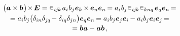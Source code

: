 \nopagebreak\vspace{-0.5em}
\begin{multline}\label{vectorcrossvectorcrossidentity}
\bigl( \bm{a} \times \bm{b} \hspace{.15ex}\bigr) \hspace{-0.33ex} \times \hspace{-0.22ex} \UnitDyad
= \permutationsparitysymbols{i\hspace{-0.1ex}j\hspace{-0.1ex}k} \hspace{.2ex} a_i \hspace{.1ex} b_j \hspace{.1ex} \bm{e}_k \hspace{-0.15ex} \times \hspace{-0.1ex} \bm{e}_n \bm{e}_n \hspace{-0.2ex}
= a_i \hspace{.1ex} b_j \hspace{.1ex} \permutationsparitysymbols{i\hspace{-0.1ex}j\hspace{-0.1ex}k} \permutationsparitysymbols{knq} \hspace{.2ex} \bm{e}_q \bm{e}_n \hspace{-0.2ex} =
\\[-0.1em]
%
= a_i b_j \bigl( \delta_{in} \delta_{j\hspace{-0.1ex}q} \hspace{-0.22ex} - \delta_{iq} \delta_{jn} \bigr) \bm{e}_q \bm{e}_n \hspace{-0.2ex}
= a_i b_j \bm{e}_j \bm{e}_i \hspace{-0.12ex} - a_i b_j \bm{e}_i \bm{e}_j \hspace{-0.2ex} =
\\[-0.1em]
%
= \bm{b} \bm{a} - \bm{a} \bm{b}
\hspace{.2ex},
\end{multline}

